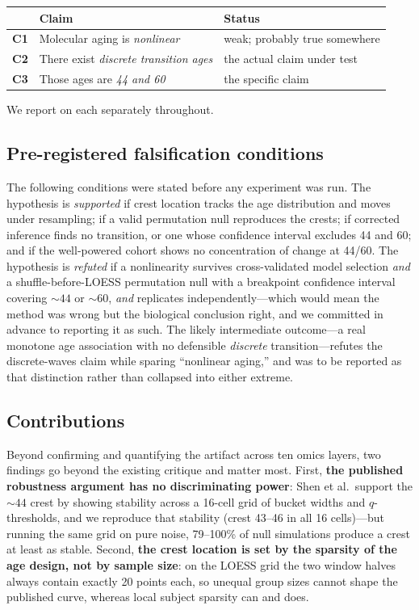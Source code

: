 \documentclass{article}
\begin{document}
\begin{center}
\begin{tabular}{cll}
\toprule
& Claim & Status \\
\midrule
\textbf{C1} & Molecular aging is \emph{nonlinear} & weak; probably true somewhere \\
\textbf{C2} & There exist \emph{discrete transition ages} & the actual claim under test \\
\textbf{C3} & Those ages are \emph{44 and 60} & the specific claim \\
\bottomrule
\end{tabular}
\end{center}

We report on each separately throughout.

\subsection{Pre-registered falsification conditions}

The following conditions were stated before any experiment was run. The hypothesis is \emph{supported} if crest location tracks the age distribution and moves under resampling; if a valid permutation null reproduces the crests; if corrected inference finds no transition, or one whose confidence interval excludes 44 and 60; and if the well-powered cohort shows no concentration of change at 44/60. The hypothesis is \emph{refuted} if a nonlinearity survives cross-validated model selection \emph{and} a shuffle-before-LOESS permutation null with a breakpoint confidence interval covering ${\sim}44$ or ${\sim}60$, \emph{and} replicates independently---which would mean the method was wrong but the biological conclusion right, and we committed in advance to reporting it as such. The likely intermediate outcome---a real monotone age association with no defensible \emph{discrete} transition---refutes the discrete-waves claim while sparing ``nonlinear aging,'' and was to be reported as that distinction rather than collapsed into either extreme.

\subsection{Contributions}

Beyond confirming and quantifying the artifact across ten omics layers, two findings go beyond the existing critique and matter most. First, \textbf{the published robustness argument has no discriminating power}: Shen et al.\ support the ${\sim}44$ crest by showing stability across a 16-cell grid of bucket widths and $q$-thresholds, and we reproduce that stability (crest 43--46 in all 16 cells)---but running the same grid on pure noise, 79--100\% of null simulations produce a crest at least as stable. Second, \textbf{the crest location is set by the sparsity of the age design, not by sample size}: on the LOESS grid the two window halves always contain exactly 20 points each, so unequal group sizes cannot shape the published curve, whereas local subject sparsity can and does.
\end{document}
